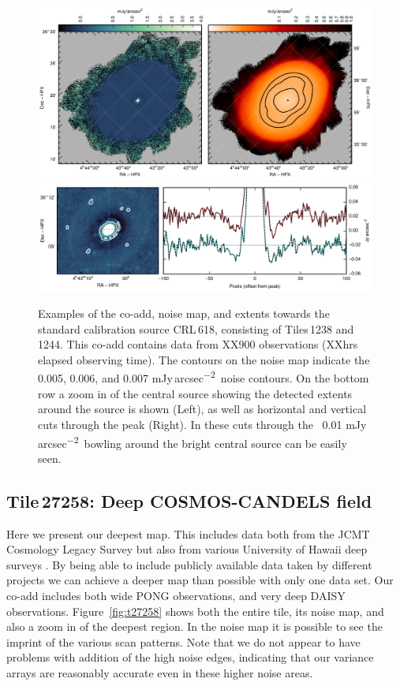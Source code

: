 \documentclass[twocolumn,times]{aastex6}
\newcommand{\jyas}{Jy\,arcsec\textsuperscript{$-$2}}
\begin{document}
\begin{figure}
  \centering
  \includegraphics{crl618-whole-map.pdf}
  \\[3mm]
  \includegraphics{crl618-sourceonly.pdf}
  \caption{Examples of the co-add, noise map, and extents towards the
    standard calibration source CRL\,618, consisting of Tiles\,1238 and
    1244. This co-add contains data from XX900 observations (XXhrs
    elapsed observing time). The contours on the noise map indicate
    the 0.005, 0.006, and 0.007 m\jyas\ noise contours. On the bottom
    row a zoom in of the central source showing the detected extents
    around the source is shown (Left), as well as horizontal and
    vertical cuts through the peak (Right). In these cuts through the
    ~0.01 m\jyas\ bowling around the bright central source can be
    easily seen. }
  \label{fig:crl618}
\end{figure}

\subsection{Tile\,27258: Deep COSMOS-CANDELS field}
Here we present our deepest map. This includes data both from the JCMT
Cosmology Legacy Survey \citep[recently published in][]{Geach2016} but
also from various University of Hawaii deep surveys
\citep{Casey2013,Chen2013,Chen2013a}. By being able to include
publicly available data taken by different projects we can achieve a
deeper map than possible with only one data set. Our co-add includes
both wide PONG observations, and very deep DAISY
observations. Figure~\ref{fig:t27258} shows both the entire tile, its
noise map, and also a zoom in of the deepest region. In the noise map
it is possible to see the imprint of the various scan patterns. Note
that we do not appear to have problems with addition of the high noise
edges, indicating that our variance arrays are reasonably accurate
even in these higher noise areas.
\end{document}
